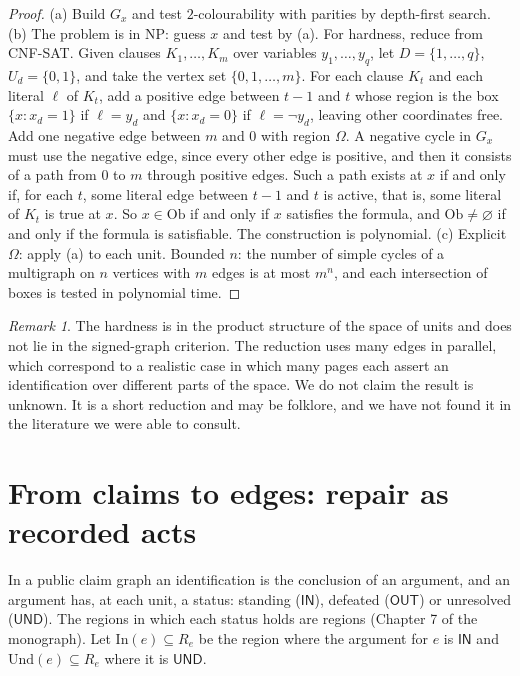 \documentclass[11pt]{article}
\theoremstyle{plain}
\theoremstyle{definition}
\theoremstyle{remark}
\newtheorem{remark}[theorem]{Remark}
\newcommand{\Om}{\Omega}
\newcommand{\Ob}{\mathrm{Ob}}
\newcommand{\IN}{\textsf{IN}}
\newcommand{\UND}{\textsf{UND}}
\newcommand{\OUT}{\textsf{OUT}}
\begin{document}
\begin{proof}
(a) Build $G_x$ and test $2$-colourability with parities by depth-first search. (b) The problem is in NP: guess $x$ and test by (a). For hardness, reduce from CNF-SAT. Given clauses $K_1,\dots,K_m$ over variables $y_1,\dots,y_q$, let $D=\{1,\dots,q\}$, $U_d=\{0,1\}$, and take the vertex set $\{0,1,\dots,m\}$. For each clause $K_t$ and each literal $\ell$ of $K_t$, add a positive edge between $t-1$ and $t$ whose region is the box $\{x: x_d=1\}$ if $\ell=y_d$ and $\{x:x_d=0\}$ if $\ell=\neg y_d$, leaving other coordinates free. Add one negative edge between $m$ and $0$ with region $\Om$. A negative cycle in $G_x$ must use the negative edge, since every other edge is positive, and then it consists of a path from $0$ to $m$ through positive edges. Such a path exists at $x$ if and only if, for each $t$, some literal edge between $t-1$ and $t$ is active, that is, some literal of $K_t$ is true at $x$. So $x\in\Ob$ if and only if $x$ satisfies the formula, and $\Ob\ne\varnothing$ if and only if the formula is satisfiable. The construction is polynomial. (c) Explicit $\Om$: apply (a) to each unit. Bounded $n$: the number of simple cycles of a multigraph on $n$ vertices with $m$ edges is at most $m^n$, and each intersection of boxes is tested in polynomial time.
\end{proof}

\begin{remark}
The hardness is in the product structure of the space of units and does not lie in the signed-graph criterion. The reduction uses many edges in parallel, which correspond to a realistic case in which many pages each assert an identification over different parts of the space. We do not claim the result is unknown. It is a short reduction and may be folklore, and we have not found it in the literature we were able to consult.
\end{remark}

\section{From claims to edges: repair as recorded acts}\label{sec:repair}

In a public claim graph an identification is the conclusion of an argument, and an argument has, at each unit, a status: standing ($\IN$), defeated ($\OUT$) or unresolved ($\UND$). The regions in which each status holds are regions (Chapter 7 of the monograph). Let $\mathrm{In}(e)\subseteq R_e$ be the region where the argument for $e$ is $\IN$ and $\mathrm{Und}(e)\subseteq R_e$ where it is $\UND$.
\end{document}

